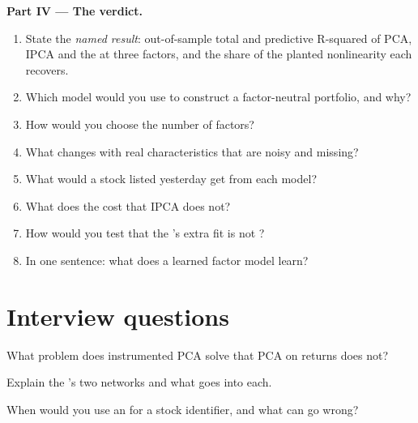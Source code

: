 \begin{problem}
\medskip\noindent\textbf{Part IV --- The verdict.}
\begin{enumerate}[resume]
\item State the \emph{named result}: out-of-sample total and predictive R-squared of PCA, IPCA and the  at three
factors, and the share of the planted nonlinearity each recovers.
\item Which model would you use to construct a factor-neutral portfolio, and why?
\item How would you choose the number of factors?
\item What changes with real characteristics that are noisy and missing?
\item What would a stock listed yesterday get from each model?
\item What does the  cost that IPCA does not?
\item How would you test that the 's extra fit is not ?
\item In one sentence: what does a learned factor model learn?
\end{enumerate}
\end{problem}

\section{Interview questions}

\begin{interviewq}\label{iq:ml:cross-sectional-deep-models:1}
What problem does instrumented PCA solve that PCA on returns does not?
\end{interviewq}

\begin{interviewq}\label{iq:ml:cross-sectional-deep-models:2}
Explain the 's two networks and what goes into each.
\end{interviewq}

\begin{interviewq}\label{iq:ml:cross-sectional-deep-models:3}
When would you use an  for a stock identifier, and what can go wrong?
\end{interviewq}

